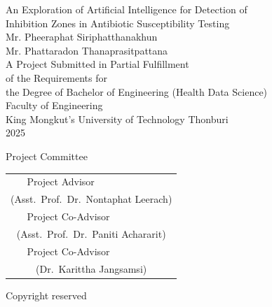 \documentclass[12pt,a4paper,oneside]{report}
\begin{document}
\begin{titlepage}
  \thispagestyle{empty}
  \centering{}

  {\normalsize
    An Exploration of Artificial Intelligence for Detection of\\
    Inhibition Zones in Antibiotic Susceptibility Testing}\\[2cm]

  {\normalsize
    Mr. Pheeraphat Siriphatthanakhun\\[0.2cm]
    Mr. Phattaradon Thanaprasitpattana}\\[2cm]

  {\normalsize
    A Project Submitted in Partial Fulfillment\\
    of the Requirements for\\
    the Degree of Bachelor of Engineering (Health Data Science)\\
    Faculty of Engineering\\
    King Mongkut's University of Technology Thonburi\\
    2025}\\[1.5cm]

  \begin{flushleft}
  Project Committee\\[1cm]
  \end{flushleft}

  \begin{tabular}{@{}p{10cm}@{\quad}l@{}}
    \dotfill & Project Advisor \\[0.3cm]
    \multicolumn{2}{c}{(Asst.\ Prof.\ Dr.\ Nontaphat Leerach)} \\[1.2cm]
    \dotfill & Project Co-Advisor \\[0.3cm]
    \multicolumn{2}{c}{(Asst.\ Prof.\ Dr.\ Paniti Achararit)} \\[1.2cm]
    \dotfill & Project Co-Advisor \\[0.3cm]
    \multicolumn{2}{c}{(Dr.\ Karittha Jangsamsi)} \\[1.2cm]
  \end{tabular}

  \vfill
  {\normalsize Copyright reserved}
\end{titlepage}

\pagestyle{fancy}
\setcounter{page}{2}
\end{document}

